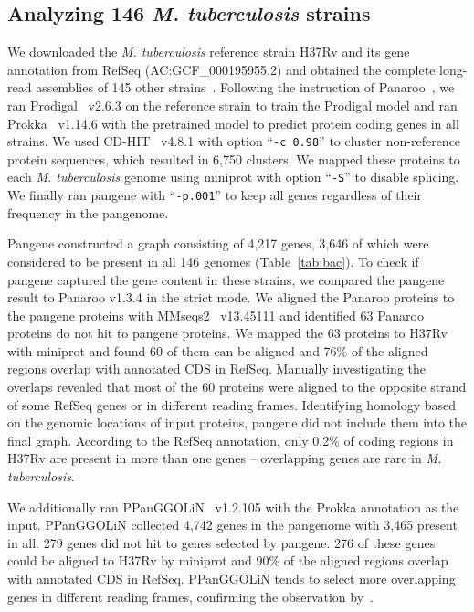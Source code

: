\documentclass[webpdf,contemporary,large,namedate]{oup-authoring-template}%
\begin{document}
\subsection{Analyzing 146 \textit{M. tuberculosis} strains}

We downloaded the \emph{M. tuberculosis} reference strain H37Rv and its gene annotation from RefSeq (AC:GCF\_000195955.2)
and obtained the complete long-read assemblies of 145 other strains~\citep{Peker:2021aa,Marin:2022aa,Hall:2023aa}.
Following the instruction of Panaroo~\citep{Tonkin-Hill:2020aa},
we ran Prodigal~\citep{Hyatt:2010aa} v2.6.3 on the reference strain to train the Prodigal model
and ran Prokka~\citep{Seemann:2014aa} v1.14.6 with the pretrained model to predict protein coding genes in all strains.
We used CD-HIT~\citep{Li:2006aa,Fu:2012aa} v4.8.1 with option ``{\tt -c 0.98}'' to cluster non-reference protein sequences,
which resulted in 6,750 clusters.
We mapped these proteins to each \emph{M. tuberculosis} genome using miniprot with option ``{\tt -S}'' to disable splicing.
We finally ran pangene with ``{\tt -p.001}''
to keep all genes regardless of their frequency in the pangenome.

Pangene constructed a graph consisting of 4,217 genes,
3,646 of which were considered to be present in all 146 genomes (Table~\ref{tab:bac}).
To check if pangene captured the gene content in these strains,
we compared the pangene result to Panaroo v1.3.4 in the strict mode.
We aligned the Panaroo proteins to the pangene proteins with MMseqs2~\citep{Steinegger:2017aa} v13.45111
and identified 63 Panaroo proteins do not hit to pangene proteins.
We mapped the 63 proteins to H37Rv with miniprot
and found 60 of them can be aligned
and 76\% of the aligned regions overlap with annotated CDS in RefSeq.
Manually investigating the overlaps revealed that most of the 60 proteins
were aligned to the opposite strand of some RefSeq genes or in different reading frames.
Identifying homology based on the genomic locations of input proteins,
pangene did not include them into the final graph.
According to the RefSeq annotation,
only 0.2\% of coding regions in H37Rv are present in more than one genes --
overlapping genes are rare in \emph{M. tuberculosis}.

We additionally ran PPanGGOLiN~\citep{Gautreau:2020aa} v1.2.105 with the Prokka annotation as the input.
PPanGGOLiN collected 4,742 genes in the pangenome with 3,465 present in all.
279 genes did not hit to genes selected by pangene.
276 of these genes could be aligned to H37Rv by miniprot
and 90\% of the aligned regions overlap with annotated CDS in RefSeq.
PPanGGOLiN tends to select more overlapping genes in different reading frames,
confirming the observation by~\citet{Tonkin-Hill:2020aa}.
\end{document}
